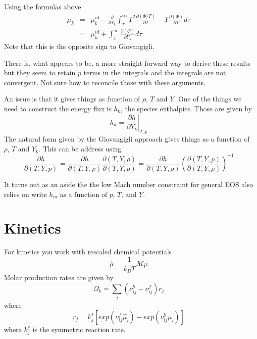 \documentclass[11pt]{article}
\begin{document}
Using the formulas above
\begin{eqnarray}
\mu_k &=& \mu_k^{id} - \frac{\partial}{\partial Y_k} \int_\tau^\infty
 T^2 \frac{\partial (\Phi/T)} {\partial T} - T \frac{\partial (\Phi)} {\partial T} d\tau \\
 &=& \mu_k^{id} + \int_\tau^\infty \frac{\partial (\Phi)} {\partial Y_k} d\tau
\end{eqnarray}
Note that this is the opposite sign to Giovangigli.

There is, what appears to be, a more straight forward way to derive these results
but they seem to retain $p$ terms in the integrals
and the integrals are not convergent. Not sure how to reconcile those with these arguments.

%
%
%
An issue is that it gives things as function of $\rho$, $T$ and $Y$.  One of the
things we need to construct the energy flux is $h_k$, the species enthalpies.
Those are given by 
\[
h_k = \left. \frac{\partial h}{\partial Y_k} \right|_{T,p}
\]
The natural form given by the Giovangigli approach gives things as a function of $\rho$, $T$ and $Y_k$.
This can be address using
\[
\frac{\partial h}{\partial (T,Y,p)}
= \frac{\partial h}{\partial (T,Y,\rho)}
\frac{\partial (T,Y,\rho)}{\partial (T,Y,p)}
= \frac{\partial h}{\partial (T,Y,\rho)}
\left (\frac{\partial (T,Y,p)}{\partial (T,Y,\rho)} \right)^{-1}
\]

It turns out as an aside the the low Mach number constraint for general EOS also relies on
write $h_m$ as a function of $p$, $T$, and $Y$.

\section{Kinetics}

For kinetics you work with rescaled chemical potentials
\[
\hat{\mu} = \frac{1}{k_B T} \mathcal{M} \mu
\]
Molar production rates are given by
\[
\Omega_k = \sum_j (\nu_{ij}^b - \nu_{ij}^f) r_j
\]
where 
\[
r_j = k_j^s \left [ exp(\nu_{ij}^f \hat{\mu}_i) - exp ( \nu_{ij}^b \hat{\mu}_i) \right ] 
\]
where $k_j^s$ is the symmetric reaction rate.
\end{document}
